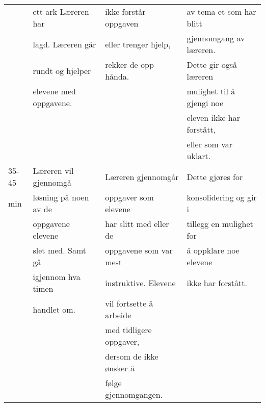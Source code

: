 \documentclass{article}
\begin{document}
\begin{center}
\begin{tabular}{l|l|l|l}
 & ett ark Læreren har & ikke forstår oppgaven & av tema et som har blitt\\
 & lagd. Læreren går & eller trenger hjelp, & gjennomgang av læreren.\\
 & rundt og hjelper & rekker de opp hånda. & Dette gir også læreren\\
 & elevene med oppgavene. &  & mulighet til å gjengi noe\\
 &  &  & eleven ikke har forstått,\\
 &  &  & eller som  var uklart.\\
\hline
35-45 & Læreren vil gjennomgå & Læreren gjennomgår & Dette gjøres for\\
min & løsning på noen av de & oppgaver som elevene & konsolidering og gir i\\
 & oppgavene elevene & har slitt med eller de & tillegg en mulighet for\\
 & slet med. Samt gå & oppgavene som var mest & å oppklare noe elevene\\
 & igjennom hva timen & instruktive. Elevene & ikke har forstått.\\
 & handlet om. & vil fortsette å arbeide & \\
 &  & med tidligere oppgaver, & \\
 &  & dersom de ikke ønsker å & \\
 &  & følge gjennomgangen. & \\
\end{tabular}
\end{center}
\newpage
\end{document}
